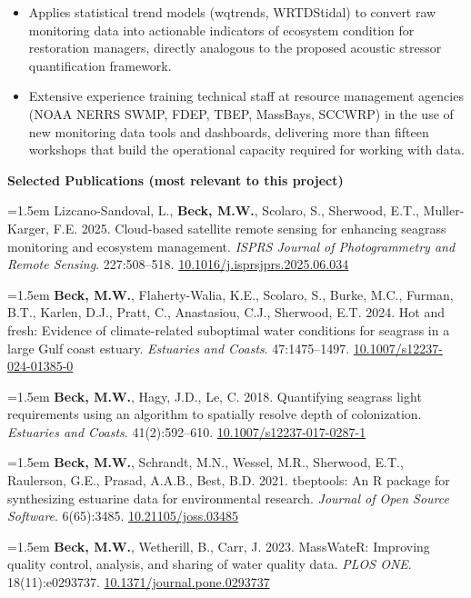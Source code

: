\documentclass[letterpaper,12pt]{article}
\newcommand{\pub}[1]{%
  \begingroup
  \hangindent=1.5em
  #1\par
  \endgroup
  \vspace{3pt}%
}
\begin{document}
\begin{itemize}
\item Applies statistical trend models (wqtrends, WRTDStidal) to convert raw monitoring data into actionable indicators of ecosystem condition for restoration managers, directly analogous to the proposed acoustic stressor quantification framework.
\item Extensive experience training technical staff at resource management agencies (NOAA NERRS SWMP, FDEP, TBEP, MassBays, SCCWRP) in the use of new monitoring data tools and dashboards, delivering more than fifteen workshops that build the operational capacity required for working with data.
\end{itemize}

\vspace{4pt}
\noindent\textbf{Selected Publications (most relevant to this project)}

\vspace{4pt}
\pub{Lizcano-Sandoval, L., \textbf{Beck, M.W.}, Scolaro, S., Sherwood, E.T., Muller-Karger, F.E. 2025. Cloud-based satellite remote sensing for enhancing seagrass monitoring and ecosystem management. \textit{ISPRS Journal of Photogrammetry and Remote Sensing}. 227:508--518. {\footnotesize\href{https://doi.org/10.1016/j.isprsjprs.2025.06.034}{10.1016/j.isprsjprs.2025.06.034}}}

\pub{\textbf{Beck, M.W.}, Flaherty-Walia, K.E., Scolaro, S., Burke, M.C., Furman, B.T., Karlen, D.J., Pratt, C., Anastasiou, C.J., Sherwood, E.T. 2024. Hot and fresh: Evidence of climate-related suboptimal water conditions for seagrass in a large Gulf coast estuary. \textit{Estuaries and Coasts}. 47:1475--1497. {\footnotesize\href{https://doi.org/10.1007/s12237-024-01385-0}{10.1007/s12237-024-01385-0}}}

\pub{\textbf{Beck, M.W.}, Hagy, J.D., Le, C. 2018. Quantifying seagrass light requirements using an algorithm to spatially resolve depth of colonization. \textit{Estuaries and Coasts}. 41(2):592--610. {\footnotesize\href{http://dx.doi.org/10.1007/s12237-017-0287-1}{10.1007/s12237-017-0287-1}}}

\pub{\textbf{Beck, M.W.}, Schrandt, M.N., Wessel, M.R., Sherwood, E.T., Raulerson, G.E., Prasad, A.A.B., Best, B.D. 2021. tbeptools: An R package for synthesizing estuarine data for environmental research. \textit{Journal of Open Source Software}. 6(65):3485. {\footnotesize\href{https://doi.org/10.21105/joss.03485}{10.21105/joss.03485}}}

\pub{\textbf{Beck, M.W.}, Wetherill, B., Carr, J. 2023. MassWateR: Improving quality control, analysis, and sharing of water quality data. \textit{PLOS ONE}. 18(11):e0293737. {\footnotesize\href{https://doi.org/10.1371/journal.pone.0293737}{10.1371/journal.pone.0293737}}}
\end{document}
